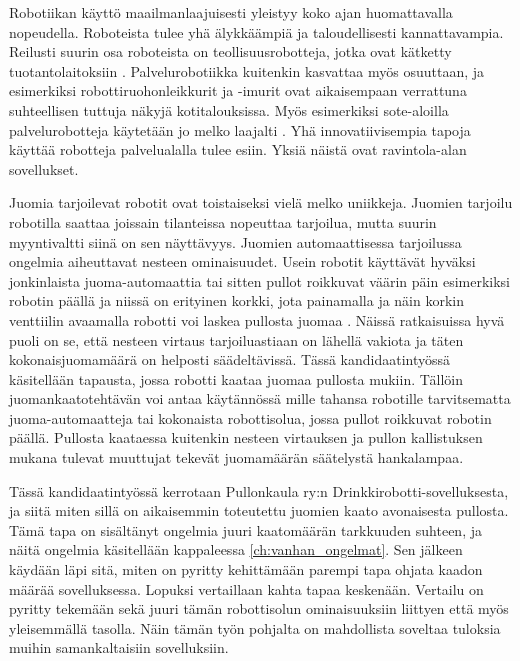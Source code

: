Robotiikan käyttö maailmanlaajuisesti yleistyy koko ajan huomattavalla nopeudella. Roboteista tulee yhä älykkäämpiä ja taloudellisesti kannattavampia. Reilusti suurin osa roboteista on teollisuusrobotteja, jotka ovat kätketty tuotantolaitoksiin \cite{Heer2020}. Palvelurobotiikka kuitenkin kasvattaa myös osuuttaan, ja esimerkiksi robottiruohonleikkurit ja -imurit ovat aikaisempaan verrattuna suhteellisen tuttuja näkyjä kotitalouksissa. Myös esimerkiksi sote-aloilla palvelurobotteja käytetään jo melko laajalti \cite{Jyvaskylanyliopisto2018}. Yhä innovatiivisempia tapoja käyttää robotteja palvelualalla tulee esiin. Yksiä näistä ovat ravintola-alan sovellukset.

Juomia tarjoilevat robotit ovat toistaiseksi vielä melko uniikkeja. Juomien tarjoilu robotilla saattaa joissain tilanteissa nopeuttaa tarjoilua, mutta suurin myyntivaltti siinä on sen näyttävyys. Juomien automaattisessa tarjoilussa ongelmia aiheuttavat nesteen ominaisuudet. Usein robotit käyttävät hyväksi jonkinlaista juoma-automaattia \cite{Kelly2020} tai sitten pullot roikkuvat väärin päin esimerkiksi robotin päällä ja niissä on erityinen korkki, jota painamalla ja näin korkin venttiilin avaamalla robotti voi laskea pullosta juomaa \cite{Ro2016}. Näissä ratkaisuissa hyvä puoli on se, että nesteen virtaus tarjoiluastiaan on lähellä vakiota ja täten kokonaisjuomamäärä on helposti säädeltävissä. Tässä kandidaatintyössä käsitellään tapausta, jossa robotti kaataa juomaa pullosta mukiin. Tällöin juomankaatotehtävän voi antaa käytännössä mille tahansa robotille tarvitsematta juoma-automaatteja tai kokonaista robottisolua, jossa pullot roikkuvat robotin päällä. Pullosta kaataessa kuitenkin nesteen virtauksen ja pullon kallistuksen mukana tulevat muuttujat tekevät juomamäärän säätelystä hankalampaa.

Tässä kandidaatintyössä kerrotaan Pullonkaula ry:n Drinkkirobotti-sovelluksesta, ja siitä miten sillä on aikaisemmin toteutettu juomien kaato avonaisesta pullosta. Tämä tapa on sisältänyt ongelmia juuri kaatomäärän tarkkuuden suhteen, ja näitä ongelmia käsitellään kappaleessa \ref{ch:vanhan_ongelmat}. Sen jälkeen käydään läpi sitä, miten on pyritty kehittämään parempi tapa ohjata kaadon määrää sovelluksessa. Lopuksi vertaillaan kahta tapaa keskenään. Vertailu on pyritty tekemään sekä juuri tämän robottisolun ominaisuuksiin liittyen että myös yleisemmällä tasolla. Näin tämän työn pohjalta on mahdollista soveltaa tuloksia muihin samankaltaisiin sovelluksiin.
